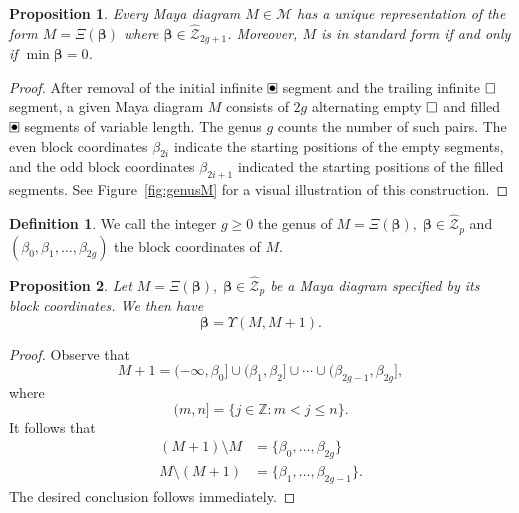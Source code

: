 \documentclass{amsart}
\newtheorem{proposition}{Proposition}
\theoremstyle{definition}
\newtheorem{definition}{Definition}
\newcommand{\Z}{\mathbb{Z}}
\newcommand{\bbeta}{{\boldsymbol{\beta}}}
\newcommand{\bmu}{{\boldsymbol{\mu}}}
\newcommand{\cM}{\mathcal{M}}
\newcommand{\cZ}{\mathcal{Z}}
\newcommand{\cZo}{\mathcal{Z}_{\text{odd}}}
\newcommand{\hcZ}{\hat{\cZ}}
\renewcommand{\boxdot}{{\ \clap{\raise0.25ex\hbox{$\bullet$}}\clap{$\square$}\ }}
\newcommand{\emptybox}{\hbox{$\square$}}
\begin{document}
\begin{proposition}
  Every Maya diagram $M\in \cM$ has a unique representation of the
  form $M=\Xi(\bbeta)$ where $\bbeta\in \hcZ_{2g+1}$. Moreover, $M$ is
  in standard form if and only if $\min \bbeta = 0$.
\end{proposition}
\begin{proof}
  After removal of the initial infinite $\boxdot$ segment and the
  trailing infinite $\emptybox$ segment, a given Maya diagram $M$
  consists of $2g$ alternating empty $\emptybox$ and filled $\boxdot$
  segments of variable length.  The genus $g$ counts the number of
  such pairs.
  The even block coordinates $\beta_{2i}$ indicate the starting
  positions of the empty segments, and the odd block coordinates
  $\beta_{2i+1}$ indicated the starting positions of the filled
  segments.  See Figure~\ref{fig:genusM} for a visual illustration of
  this construction.
\end{proof}

\begin{definition}\label{def:genus}
  We call the integer $g\geq 0$ the genus of
  $M= \Xi(\bbeta),\; \bbeta\in \hcZ_p$ and
  $(\beta_0,\beta_1,\ldots, \beta_{2g})$ the block coordinates of $M$.
\end{definition}
\noindent



\begin{proposition}
  \label{prop:1cyclic}
  Let $M = \Xi(\bbeta),\; \bbeta\in \hcZ_p$ be a Maya diagram
  specified by its block coordinates.  We then have
  \[ \bbeta = \Upsilon(M,M+1).\]
\end{proposition}
\begin{proof}
  Observe that
  \[ M+1 = (-\infty, \beta_0] \cup (\beta_1,\beta_2] \cup \cdots \cup
  (\beta_{2g-1}, \beta_{2g}],\]
  where
  \[ (m,n] = \{ j\in \Z \colon m<j\leq n \}.\]
  It follows that
  \begin{align*}
    (M+1)\setminus M &= \{ \beta_0, \ldots, \beta_{2g} \}\\
    M\setminus (M+1) &= \{ \beta_1,\ldots, \beta_{2g-1} \}.
  \end{align*}
  The desired conclusion follows immediately.
\end{proof}
\end{document}
